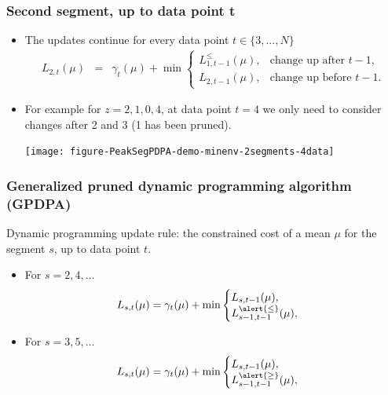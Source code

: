 \documentclass{beamer}
\begin{document}
\begin{frame}
  \frametitle{Second segment, up to data point t}
  \begin{itemize}
  \item The updates continue for every data point $t\in\{3, ..., N\}$
    \begin{eqnarray*}
      L_{2,t}(\mu) &=&  \gamma_t(\mu) + \min
      \begin{cases}
        L_{1,t-1}^{\leq}(\mu), & \text{change up after $t-1$,}\\
        L_{2,t-1}(\mu), & \text{change up before $t-1$.}
      \end{cases}
    \end{eqnarray*}
  \item For example for $z = 2, 1, 0, 4$, at data point $t=4$
    we only need to consider changes after 2 and 3 (1 has been
    pruned).
    \begin{center}
      \texttt{[image: figure-PeakSegPDPA-demo-minenv-2segments-4data]}
    \end{center}
  \end{itemize}
\end{frame}


\begin{frame}
  \frametitle{Generalized pruned dynamic programming algorithm (GPDPA)}
  Dynamic programming update rule: the constrained cost of a
  mean $\mu$ for the segment $s$, up to data point $t$.
  \begin{itemize}
  \item For $s=2, 4, \dots$
    \begin{equation*}
      L_{s,t}(\mu) = \gamma_t(\mu) + \min
      \begin{cases}
        L_{s,t-1}(\mu),\\
        L_{s-1,t-1}^{\alert{\leq}}(\mu),
      \end{cases}
    \end{equation*}
  \item For $s=3, 5, \dots$
    \begin{equation*}
      L_{s,t}(\mu) = \gamma_t(\mu) + \min
      \begin{cases}
        L_{s,t-1}(\mu),\\
        L_{s-1,t-1}^{\alert{\geq}}(\mu),
      \end{cases}
    \end{equation*}
  \end{itemize}
\end{frame}
\end{document}
